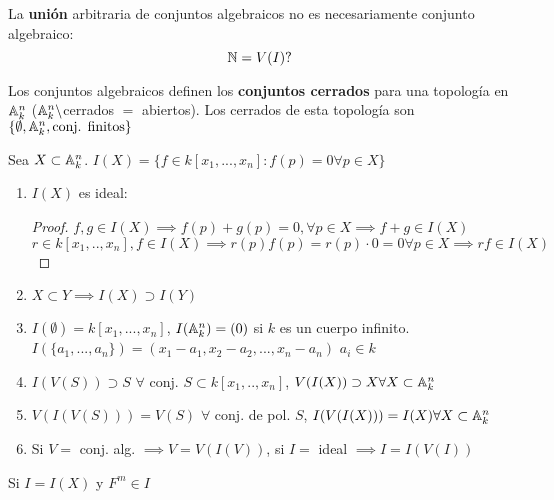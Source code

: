 \begin{obs}
    La \textbf{unión} arbitraria de conjuntos algebraicos no es necesariamente conjunto algebraico:
    \[
        \mathbb{N}=V(I)?
    \]
\end{obs}
\begin{obs}
    Los conjuntos algebraicos definen los \textbf{conjuntos cerrados} para una topología en $\mathbb{A}_k^n$ ($\mathbb{A}_k^n\setminus$cerrados $=$ abiertos). Los cerrados de esta topología son $\{\emptyset,\mathbb{A}_k^n, \text{conj. finitos}\}$
\end{obs}
\begin{defn}
    Sea $X\subset\mathbb{A}_k^n$. $I(X)=\{f\in k[x_1,...,x_n]: f(p)=0\forall p\in X\}$
\end{defn}
\begin{ppty}
    \begin{enumerate}
        \item $I(X)$ es ideal:
              \begin{proof}
                  $f,g\in I(X)\implies f(p)+g(p)=0,\forall p\in X\implies f+g\in I(X)$\\
                  $r\in k[x_1,..,x_n], f\in I(X)\implies r(p)f(p)=r(p)\cdot 0=0\forall p\in X\implies rf\in I(X)$
              \end{proof}
        \item $X\subset Y\implies I(X)\supset I(Y)$
        \item $I(\emptyset)=k[x_1,...,x_n]$, $I(\mathbb{A}_k^n)=(0)$ si $k$ es un cuerpo infinito. $I(\{a_1,...,a_n\})=(x_1-a_1,x_2-a_2,...,x_n-a_n)$ $a_i\in k$
        \item $I(V(S))\supset S$ $\forall$ conj. $S\subset k[x_1,..,x_n]$, $V(I(X))\supset X\forall X\subset \mathbb{A}_k^n$
        \item $V(I(V(S)))=V(S)$ $\forall$ conj. de pol. $S$, $I(V(I(X)))=I(X)\forall X\subset\mathbb{A}_k^n$
        \item Si $V=$ conj. alg. $\implies V=V(I(V))$, si $I=$ ideal $\implies I=I(V(I))$
    \end{enumerate}
\end{ppty}
\begin{obs}
    Si $I=I(X)$ y $F^m\in I$
\end{obs}

